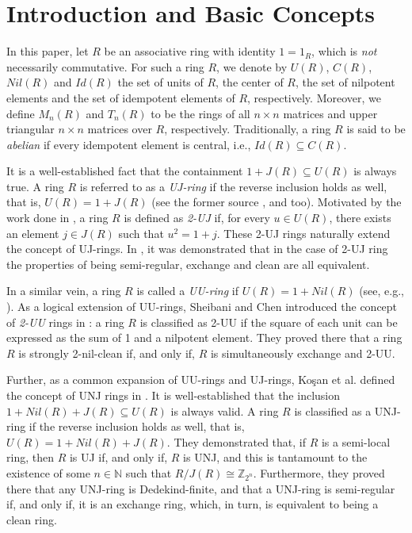 \documentclass[12pt]{amsart}
\theoremstyle{definition}
\begin{document}
\section{Introduction and Basic Concepts}

In this paper, let \( R \) be an associative ring with identity \( 1=1_R \), which is {\it not} necessarily commutative. For such a ring \( R \), we denote by \( U(R) \), \( C(R) \), \( Nil(R) \) and \( Id(R) \) the set of units of $R$, the center of $R$, the set of nilpotent elements and the set of idempotent elements of \( R \), respectively. Moreover, we define \( M_n(R) \) and \( T_n(R) \) to be the rings of all \( n \times n \) matrices and upper triangular \( n \times n \) matrices over \( R \), respectively. Traditionally, a ring \( R \) is said to be {\it abelian} if every idempotent element is central, i.e., \( Id(R) \subseteq C(R) \).

It is a well-established fact that the containment \( 1 + J(R) \subseteq U(R) \) is always true. A ring \( R \) is referred to as a {\it UJ-ring} if the reverse inclusion holds as well, that is, \( U(R) = 1 + J(R) \) (see the former source \cite{D}, and \cite{14} too). Motivated by the work done in \cite{1}, a ring \( R \) is defined as {\it 2-UJ} if, for every \( u \in U(R) \), there exists an element \( j \in J(R) \) such that \( u^2 = 1 + j \). These 2-UJ rings naturally extend the concept of UJ-rings. In \cite{1}, it was demonstrated that in the case of 2-UJ ring the properties of being semi-regular, exchange and clean are all equivalent.

In a similar vein, a ring \( R \) is called a {\it UU-ring} if \( U(R) = 1 + Nil(R) \) (see, e.g., \cite{12}). As a logical extension of UU-rings, Sheibani and Chen introduced the concept of {\it 2-UU} rings in \cite{10}: a ring \( R \) is classified as 2-UU if the square of each unit can be expressed as the sum of 1 and a nilpotent element. They proved there that a ring \( R \) is strongly 2-nil-clean if, and only if, \( R \) is simultaneously exchange and 2-UU.

Further, as a common expansion of UU-rings and UJ-rings, Ko\c{s}an et al. defined the concept of UNJ rings in \cite{22}. It is well-established that the inclusion \( 1 + Nil(R) + J(R) \subseteq U(R) \) is always valid. A ring \( R \) is classified as a UNJ-ring if the reverse inclusion holds as well, that is, \( U(R) = 1 + Nil(R) + J(R) \). They demonstrated that, if \( R \) is a semi-local ring, then \( R \) is UJ if, and only if, \( R \) is UNJ, and this is tantamount to the existence of some \( n \in \mathbb{N} \) such that \( R/J(R) \cong \mathbb{Z}_{2^n} \). Furthermore, they proved there that any UNJ-ring is Dedekind-finite, and that a UNJ-ring is semi-regular if, and only if, it is an exchange ring, which, in turn, is equivalent to being a clean ring.
\end{document}
